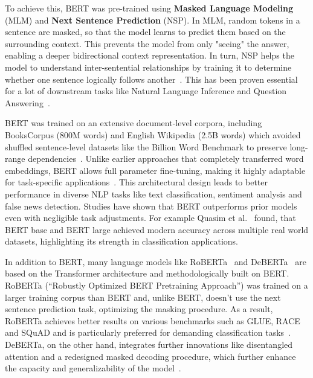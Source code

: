 To achieve this, BERT was pre-trained using \textbf{Masked Language Modeling} (MLM) and \textbf{Next Sentence Prediction} (NSP). In MLM, random tokens in a sentence are masked, so that the model learns to predict them based on the surrounding context. This prevents the model from only "seeing" the answer, enabling a deeper bidirectional context representation. In turn, NSP helps the model to understand inter-sentential relationships by training it to determine whether one sentence logically follows another~\cite{devlin2019bert}. This has been proven essential for a lot of downstream tasks like Natural Language Inference and Question Answering~\cite{sun2020finetuneberttextclassification}.

BERT was trained on an extensive document-level corpora, including BooksCorpus (800M words) and English Wikipedia (2.5B words) which avoided shuffled sentence-level datasets like the Billion Word Benchmark to preserve long-range dependencies~\cite{devlin2019bert}. Unlike earlier approaches that completely transferred word embeddings, BERT allows full parameter fine-tuning, making it highly adaptable for task-specific applications~\cite{korootev2021BERT}. This architectural design leads to better performance in diverse NLP tasks like text classification, sentiment analysis and false news detection. Studies have shown that BERT outperforms prior models even with negligible task adjustments. For example Quasim et al.~\cite{qasim2022fine} found, that BERT base and BERT large achieved modern accuracy across multiple real world datasets, highlighting its strength in classification applications.

In addition to BERT, many language models like RoBERTa~\cite{liu2019roberta} and DeBERTa~\cite{he2021deberta} are based on the Transformer architecture and methodologically built on BERT. RoBERTa (“Robustly Optimized BERT Pretraining Approach”) was trained on a larger training corpus than BERT and, unlike BERT, doesn't use the next sentence prediction task, optimizing the masking procedure. As a result, RoBERTa achieves better results on various benchmarks such as GLUE, RACE and SQuAD and is particularly preferred for demanding classification tasks~\cite{liu2019roberta}. DeBERTa, on the other hand, integrates further innovations like disentangled attention and a redesigned masked decoding procedure, which further enhance the capacity and generalizability of the model~\cite{he2021deberta, he2023debertav3}.


